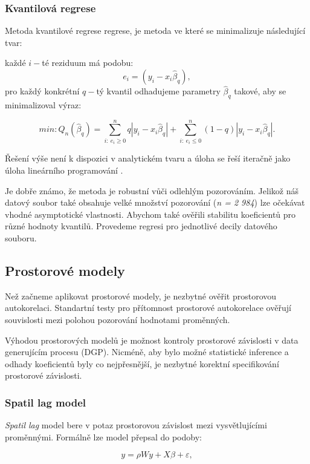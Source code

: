 \documentclass[11pt, a4paper]{article}
\begin{document}
\subsubsection{Kvantilová regrese}
Metoda kvantilové regrese regrese, je metoda ve které se minimalizuje následující tvar:

každé $i-$té reziduum má podobu:
$$e_{i} = (y_{i} - x_{i}\hat\beta_{q}), $$
pro každý konkrétní $q-$tý kvantil odhadujeme parametry $\hat \beta_{q}$ takové, aby se minimalizoval výraz:

$$min: Q_{n}(\hat\beta_{q}) = \sum_{i:\ e_{i}\geq 0}^{n} q|y_{i} - x_{i} \hat\beta_{q}| + \sum_{i:\ e_{i}	\leq 0}^{n} (1-q)|y_{i} - x_{i} \hat\beta_{q}|.$$

Řešení výše není k dispozici v analytickém tvaru a úloha se řeší iteračně jako úloha lineárního programování \cite{greene2003econometric}.

Je dobře známo, že metoda je robustní vůči odlehlým pozorováním. Jelikož náš datový soubor také obsahuje velké množství pozorování (\textit{n = 2 984}) lze očekávat vhodné asymptotické vlastnosti. Abychom také ověřili stabilitu koeficientů pro různé hodnoty kvantilů. Provedeme regresi pro jednotlivé decily datového souboru.

\subsection{Prostorové modely}
Než začneme aplikovat prostorové modely, je nezbytné ověřit prostorovou autokorelaci. Standartní testy pro přítomnost prostorové autokorelace ověřují souvislosti mezi polohou pozorování hodnotami proměnných. 

Výhodou prostorových modelů je možnost kontroly prostorové závislosti v data generujícím procesu (DGP). Nicméně, aby bylo možné statistické inference a odhady koeficientů byly co nejpřesnější, je nezbytné korektní specifikování prostorové závislosti.

\subsubsection{Spatil lag model}

\textit{Spatil lag} model bere v potaz prostorovou závislost mezi vysvětlujícími proměnnými. Formálně lze model přepsal do podoby:

\begin{equation} \label{spatial lag}
    y = \rho W y + X\beta + \varepsilon, 
\end{equation}
\end{document}
